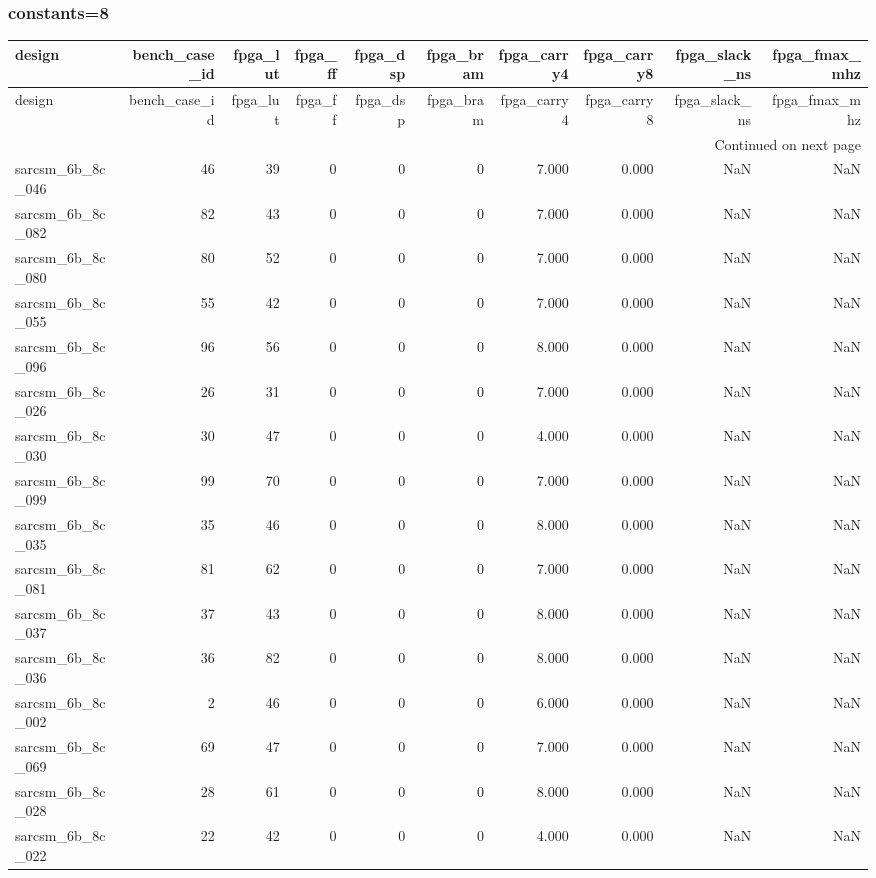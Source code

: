 \documentclass{article}
\begin{document}
\subsubsection*{constants=8}
\begin{longtable}{lrrrrrrrrr}
\toprule
design & bench\_case\_id & fpga\_lut & fpga\_ff & fpga\_dsp & fpga\_bram & fpga\_carry4 & fpga\_carry8 & fpga\_slack\_ns & fpga\_fmax\_mhz \\
\midrule
\endfirsthead
\toprule
design & bench\_case\_id & fpga\_lut & fpga\_ff & fpga\_dsp & fpga\_bram & fpga\_carry4 & fpga\_carry8 & fpga\_slack\_ns & fpga\_fmax\_mhz \\
\midrule
\endhead
\midrule
\multicolumn{10}{r}{Continued on next page} \\
\midrule
\endfoot
\bottomrule
\endlastfoot
sarcsm\_6b\_8c\_046 & 46 & 39 & 0 & 0 & 0 & 7.000 & 0.000 & NaN & NaN \\
sarcsm\_6b\_8c\_082 & 82 & 43 & 0 & 0 & 0 & 7.000 & 0.000 & NaN & NaN \\
sarcsm\_6b\_8c\_080 & 80 & 52 & 0 & 0 & 0 & 7.000 & 0.000 & NaN & NaN \\
sarcsm\_6b\_8c\_055 & 55 & 42 & 0 & 0 & 0 & 7.000 & 0.000 & NaN & NaN \\
sarcsm\_6b\_8c\_096 & 96 & 56 & 0 & 0 & 0 & 8.000 & 0.000 & NaN & NaN \\
sarcsm\_6b\_8c\_026 & 26 & 31 & 0 & 0 & 0 & 7.000 & 0.000 & NaN & NaN \\
sarcsm\_6b\_8c\_030 & 30 & 47 & 0 & 0 & 0 & 4.000 & 0.000 & NaN & NaN \\
sarcsm\_6b\_8c\_099 & 99 & 70 & 0 & 0 & 0 & 7.000 & 0.000 & NaN & NaN \\
sarcsm\_6b\_8c\_035 & 35 & 46 & 0 & 0 & 0 & 8.000 & 0.000 & NaN & NaN \\
sarcsm\_6b\_8c\_081 & 81 & 62 & 0 & 0 & 0 & 7.000 & 0.000 & NaN & NaN \\
sarcsm\_6b\_8c\_037 & 37 & 43 & 0 & 0 & 0 & 8.000 & 0.000 & NaN & NaN \\
sarcsm\_6b\_8c\_036 & 36 & 82 & 0 & 0 & 0 & 8.000 & 0.000 & NaN & NaN \\
sarcsm\_6b\_8c\_002 & 2 & 46 & 0 & 0 & 0 & 6.000 & 0.000 & NaN & NaN \\
sarcsm\_6b\_8c\_069 & 69 & 47 & 0 & 0 & 0 & 7.000 & 0.000 & NaN & NaN \\
sarcsm\_6b\_8c\_028 & 28 & 61 & 0 & 0 & 0 & 8.000 & 0.000 & NaN & NaN \\
sarcsm\_6b\_8c\_022 & 22 & 42 & 0 & 0 & 0 & 4.000 & 0.000 & NaN & NaN \\

\end{longtable}
\end{document}
